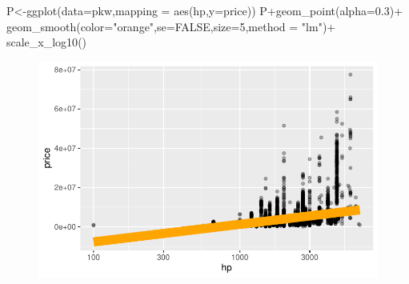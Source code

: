 \documentclass[
  letterpaper,
  DIV=11,
  numbers=noendperiod]{scrartcl}
\newenvironment{Shaded}{\begin{snugshade}}{\end{snugshade}}
\newcommand{\AttributeTok}[1]{\textcolor[rgb]{0.40,0.45,0.13}{#1}}
\newcommand{\ConstantTok}[1]{\textcolor[rgb]{0.56,0.35,0.01}{#1}}
\newcommand{\DecValTok}[1]{\textcolor[rgb]{0.68,0.00,0.00}{#1}}
\newcommand{\FloatTok}[1]{\textcolor[rgb]{0.68,0.00,0.00}{#1}}
\newcommand{\FunctionTok}[1]{\textcolor[rgb]{0.28,0.35,0.67}{#1}}
\newcommand{\NormalTok}[1]{\textcolor[rgb]{0.00,0.23,0.31}{#1}}
\newcommand{\OtherTok}[1]{\textcolor[rgb]{0.00,0.23,0.31}{#1}}
\newcommand{\SpecialCharTok}[1]{\textcolor[rgb]{0.37,0.37,0.37}{#1}}
\newcommand{\StringTok}[1]{\textcolor[rgb]{0.13,0.47,0.30}{#1}}
\begin{document}
\begin{Shaded}
\begin{Highlighting}[]
\NormalTok{P}\OtherTok{\textless{}{-}}\FunctionTok{ggplot}\NormalTok{(}\AttributeTok{data=}\NormalTok{pkw,}\AttributeTok{mapping =} \FunctionTok{aes}\NormalTok{(hp,}\AttributeTok{y=}\NormalTok{price))}
\NormalTok{P}\SpecialCharTok{+}\FunctionTok{geom\_point}\NormalTok{(}\AttributeTok{alpha=}\FloatTok{0.3}\NormalTok{)}\SpecialCharTok{+}
  \FunctionTok{geom\_smooth}\NormalTok{(}\AttributeTok{color=}\StringTok{"orange"}\NormalTok{,}\AttributeTok{se=}\ConstantTok{FALSE}\NormalTok{,}\AttributeTok{size=}\DecValTok{5}\NormalTok{,}\AttributeTok{method =} \StringTok{"lm"}\NormalTok{)}\SpecialCharTok{+}
  \FunctionTok{scale\_x\_log10}\NormalTok{()}
\end{Highlighting}
\end{Shaded}

\begin{figure}[H]

{\centering \includegraphics[width=17.1875in,height=\textheight]{pakwheels_files/figure-pdf/unnamed-chunk-31-1.pdf}

}

\end{figure}

\hypertarget{section-5}{%
\subsection{}\label{section-5}}
\end{document}
